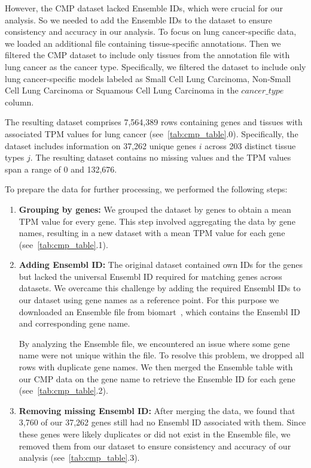 However, the CMP dataset lacked Ensemble IDs, which were crucial for our analysis.
So we needed to add the Ensemble IDs to the dataset to ensure consistency and accuracy in our analysis.
To focus on lung cancer-specific data, we loaded an additional file containing tissue-specific annotations. \cite{cmp_tissue_models}
Then we filtered the CMP dataset to include only tissues from the annotation file with lung cancer as the cancer type.
Specifically, we filtered the dataset to include only lung cancer-specific models labeled as
Small Cell Lung Carcinoma, Non-Small Cell Lung Carcinoma or Squamous Cell Lung Carcinoma in the $cancer\_type$ column.

The resulting dataset comprises 7,564,389 rows containing genes and tissues
with associated TPM values for lung cancer (see~\cref{tab:cmp_table}.0).
Specifically, the dataset includes information on 37,262 unique genes $i$ across 203 distinct tissue types $j$.
The resulting dataset contains no missing values and the TPM values span a range of 0 and 132,676.

To prepare the data for further processing, we performed the following steps:
\begin{enumerate}
    \item \textbf{Grouping by genes:}
    We grouped the dataset by genes to obtain a mean TPM value for every gene.
    This step involved aggregating the data by gene names, resulting in a new dataset
    with a mean TPM value for each gene (see~\cref{tab:cmp_table}.1).

    \item \textbf{Adding Ensembl ID:}
    The original dataset contained own IDs for the genes but lacked the universal Ensembl ID required for matching genes across datasets.
    We overcame this challenge by adding the required Ensembl IDs to our dataset using gene names as a reference point.
    For this purpose we downloaded an Ensemble file from biomart~\cite{bio_marts},
    which contains the Ensembl ID and corresponding gene name.

    By analyzing the Ensemble file, we encountered an issue where some gene name were not unique within the file.
    To resolve this problem, we dropped all rows with duplicate gene names.
    We then merged the Ensemble table with our CMP data on the gene name to retrieve the Ensemble ID for each gene (see~\cref{tab:cmp_table}.2).

    \item \textbf{Removing missing Ensembl ID:}
    After merging the data, we found that 3,760 of our 37,262 genes still had no Ensembl ID associated with them.
    Since these genes were likely duplicates or did not exist in the Ensemble file,
    we removed them from our dataset to ensure consistency and accuracy of our analysis (see~\cref{tab:cmp_table}.3).
\end{enumerate}

